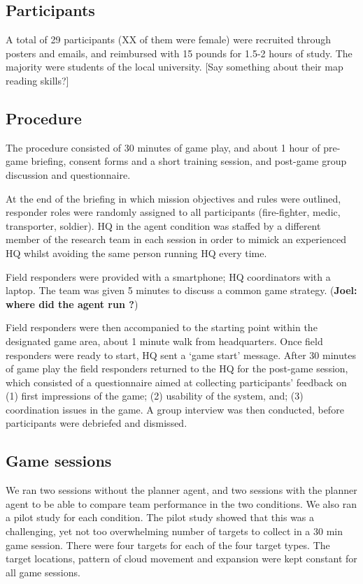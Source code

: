\subsection{Participants}
A total of 29 participants (XX of them were female) were recruited through posters and emails, and reimbursed with 15 pounds for 1.5-2 hours of study. The majority were students of the local university. [Say something about their map reading skills?]

\subsection{Procedure}
The procedure consisted of 30 minutes of game play, and about 1 hour of pre-game briefing, consent forms and a short training session, and post-game group discussion and questionnaire. 


At the end of the briefing in which mission objectives and rules were outlined, responder roles were randomly assigned to all participants (fire-fighter, medic, transporter, soldier). HQ in the agent condition was staffed by a different member of the research team in each session in order to mimick an experienced HQ whilst avoiding the same person running HQ every time. 

Field responders were provided with a smartphone; HQ coordinators with a laptop. The team was given 5 minutes to discuss a common game strategy. (\textbf{Joel: where did the agent run ?})

Field responders were then accompanied to the starting point within the designated game area, about 1 minute walk from headquarters. Once field responders were ready to start, HQ sent a `game start' message. After 30 minutes of game play the field responders returned to the HQ for the post-game session, which consisted of a questionnaire aimed at collecting participants' feedback on (1) first impressions of the game; (2) usability of the system, and; (3) coordination issues in the game. A group interview was then conducted, before participants were debriefed and dismissed.

\subsection{Game sessions}
We ran two sessions without the planner agent, and two sessions with the planner agent to be able to compare team performance in the two conditions. We also ran a pilot study for each condition. The pilot study showed that this was a challenging, yet not too overwhelming number of targets to collect in a 30 min game session. There were four targets for each of the four target types.
The target locations, pattern of cloud movement and expansion were kept constant for all game sessions. 

